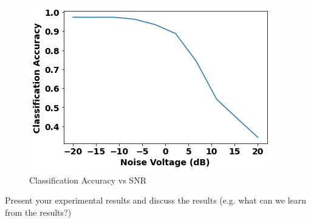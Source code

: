 \documentclass{article}
\begin{document}
\begin{figure}[H]
    \centering
    \includegraphics[width=0.45\linewidth]{classification-accuracy.png}
    \caption{Classification Accuracy vs SNR}
    \label{fig:classification accuracy}
\end{figure}

Present your experimental results and discuss
the results (e.g. what can we learn from the
results?)


\end{document}
